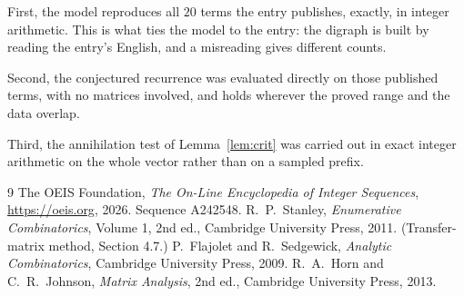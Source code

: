 \documentclass[11pt,a4paper]{article}
\theoremstyle{plain}
\theoremstyle{definition}
\begin{document}
First, the model reproduces all $20$ terms the entry publishes, exactly, in integer
arithmetic. This is what ties the model to the entry: the digraph is built by reading the
entry's English, and a misreading gives different counts.

Second, the conjectured recurrence was evaluated directly on those published terms, with no
matrices involved, and holds wherever the proved range and the data overlap.

Third, the annihilation test of Lemma~\ref{lem:crit} was carried out in exact integer
arithmetic on the whole vector rather than on a sampled prefix.

\begin{thebibliography}{9}
 The OEIS Foundation, \emph{The On-Line Encyclopedia of Integer
Sequences}, \url{https://oeis.org}, 2026. Sequence A242548.
 R.~P.~Stanley, \emph{Enumerative Combinatorics}, Volume 1, 2nd ed.,
Cambridge University Press, 2011. (Transfer-matrix method, Section 4.7.)
 P.~Flajolet and R.~Sedgewick, \emph{Analytic Combinatorics}, Cambridge
University Press, 2009.
 R.~A.~Horn and C.~R.~Johnson, \emph{Matrix Analysis}, 2nd ed., Cambridge
University Press, 2013.
\end{thebibliography}
\end{document}
